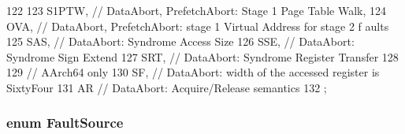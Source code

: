 \begin{DoxyCode}
122     {
123         S1PTW, // DataAbort, PrefetchAbort: Stage 1 Page Table Walk,
124         OVA,   // DataAbort, PrefetchAbort: stage 1 Virtual Address for stage 2 f
      aults
125         SAS,   // DataAbort: Syndrome Access Size
126         SSE,   // DataAbort: Syndrome Sign Extend
127         SRT,   // DataAbort: Syndrome Register Transfer
128 
129         // AArch64 only
130         SF,    // DataAbort: width of the accessed register is SixtyFour
131         AR     // DataAbort: Acquire/Release semantics
132     };
\end{DoxyCode}
\hypertarget{classArmISA_1_1ArmFault_a8771a605c5b916759188c3a191bb6202}{
\subsubsection[{FaultSource}]{\setlength{\rightskip}{0pt plus 5cm}enum {\bf FaultSource}}}
\label{classArmISA_1_1ArmFault_a8771a605c5b916759188c3a191bb6202}
